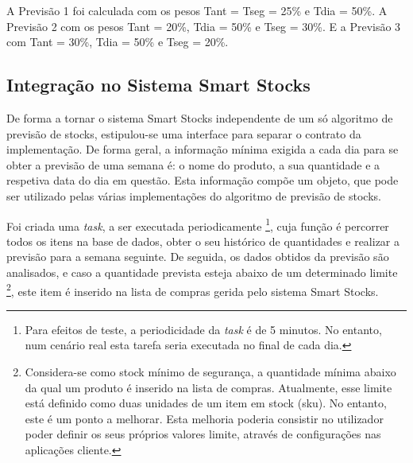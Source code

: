 

A Previsão 1 foi calculada com os pesos Tant = Tseg = 25\% e Tdia = 50\%. A Previsão 2 com os pesos Tant = 20\%, Tdia = 50\% e Tseg = 30\%.
E a Previsão 3 com Tant = 30\%, Tdia = 50\% e Tseg = 20\%.

%
%
\subsection{Integração no Sistema Smart Stocks}\label{subsec342}

De forma a tornar o sistema Smart Stocks independente de um só algoritmo de previsão de stocks, estipulou-se uma interface para separar o contrato da implementação. De forma geral, a informação mínima exigida a cada dia para se obter a previsão de uma semana é: o nome do produto, a sua quantidade e a respetiva data do dia em questão. Esta informação compõe um objeto, que pode ser utilizado pelas várias implementações do algoritmo de previsão de stocks.

Foi criada uma \textit{task}, a ser executada periodicamente \footnote{Para efeitos de teste, a periodicidade da \textit{task} é de 5 minutos. No entanto, num cenário real esta tarefa seria executada no final de cada dia.}, cuja função é percorrer todos os itens na base de dados, obter o seu histórico de quantidades e realizar a previsão para a semana seguinte. De seguida, os dados obtidos da previsão são analisados, e caso a quantidade prevista esteja abaixo de um determinado limite \footnote{Considera-se como stock mínimo de segurança, a quantidade mínima abaixo da qual um produto é inserido na lista de compras. Atualmente, esse limite está definido como duas unidades de um item em stock (\acrshort{sku}). No entanto, este é um ponto a melhorar. Esta melhoria poderia consistir no utilizador poder definir os seus próprios valores limite,  através de configurações nas aplicações cliente.}, este item é inserido na lista de compras gerida pelo sistema Smart Stocks. 
